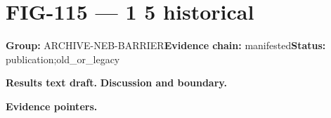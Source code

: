 \clearpage
\section{FIG-115 --- 1 5 historical}
\label{figpage:fig-115}
\textbf{Group:} ARCHIVE-NEB-BARRIER\quad \textbf{Evidence chain:} manifested\quad \textbf{Status:} publication;old\_or\_legacy

\textbf{Results text draft.} 
\textbf{Discussion and boundary.} 


\textbf{Evidence pointers.}



\vfill
